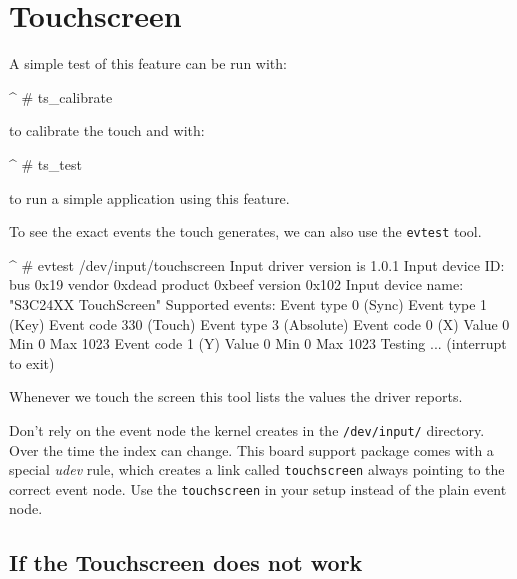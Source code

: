 
\section{Touchscreen}					\label{sec:TOUCH}

A simple test of this feature can be run with:

\begin{ptxshell}[escapechar=|]{^}
# ts_calibrate
\end{ptxshell}

to calibrate the touch and with:

\begin{ptxshell}[escapechar=|]{^}
# ts_test
\end{ptxshell}

to run a simple application using this feature.

To see the exact events the touch generates, we can also use the
\texttt{evtest} tool.

\begin{ptxshell}[escapechar=|]{^}
# evtest /dev/input/touchscreen
Input driver version is 1.0.1
Input device ID: bus 0x19 vendor 0xdead product 0xbeef version 0x102
Input device name: "S3C24XX TouchScreen"
Supported events:
  Event type 0 (Sync)
  Event type 1 (Key)
    Event code 330 (Touch)
  Event type 3 (Absolute)
    Event code 0 (X)
     Value      0
     Min        0
     Max     1023
  Event code 1 (Y)
     Value      0
     Min        0
     Max     1023
Testing ... (interrupt to exit)
\end{ptxshell}

Whenever we touch the screen this tool lists the values the driver reports.

\begin{important}
Don't rely on the event node the kernel creates in the \texttt{/dev/input/}
directory. Over the time the index can change. This board support package comes
with a special \textit{udev} rule, which creates a link called \texttt{touchscreen}
always pointing to the correct event node. Use the \texttt{touchscreen} in your
setup instead of the plain event node.
\end{important}

\subsection{If the Touchscreen does not work}

